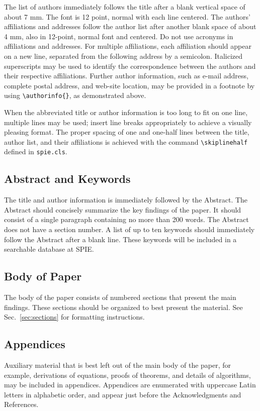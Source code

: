 \documentclass[]{spie}  %
\begin{document}
The list of authors immediately follows the title after a blank vertical space of about 7 mm.  The font is 12 point, normal with each line centered.  The authors' affiliations and addresses follow the author list after another blank space of about 4 mm, also in 12-point, normal font and centered.  Do not use acronyms in affiliations and addresses. For multiple affiliations, each affiliation should appear on a new line, separated from the following address by a semicolon.  Italicized superscripts may be used to identify the correspondence between the authors and their respective affiliations.  Further author information, such as e-mail address, complete postal address, and web-site location, may be provided in a footnote by using \verb|\authorinfo{}|, as demonstrated above.

When the abbreviated title or author information is too long to fit on one line, multiple lines may be used; insert line breaks appropriately to achieve a visually pleasing format.  The proper spacing of one and one-half lines between the title, author list, and their affiliations is achieved with the command \verb|\skiplinehalf| defined in {\tt spie.cls}.

\subsection{Abstract and Keywords} 
The title and author information is immediately followed by the Abstract. The Abstract should concisely summarize the key findings of the paper.  It should consist of a single paragraph containing no more than 200 words.  The Abstract does not have a section number.  A list of up to ten keywords should immediately follow the Abstract after a blank line.  These keywords will be included in a searchable database at SPIE.

\subsection{Body of Paper} 
The body of the paper consists of numbered sections that present the main findings.  These sections should be organized to best present the material.  See Sec.~\ref{sec:sections} for formatting instructions.

\subsection{Appendices} 
Auxiliary material that is best left out of the main body of the paper, for example, derivations of equations, proofs of theorems, and details of algorithms, may be included in appendices.  Appendices are enumerated with uppercase Latin letters in alphabetic order, and appear just before the Acknowledgments and References.
\end{document}
